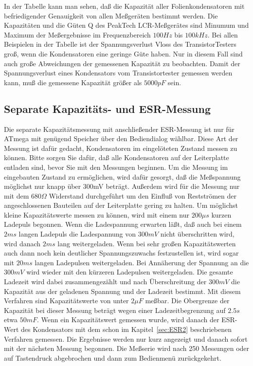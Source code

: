 In der Tabelle kann man sehen, daß die Kapazität aller Folienkondensatoren mit befriedigender Genauigkeit von allen
Meßgeräten bestimmt werden. Die Kapazitäten und die Güten Q des PeakTech LCR-Meßgerätes sind Minumum
und Maximum der Meßergebnisse im Frequenzbereich \(100 Hz\) bis \(100 kHz\).
Bei allen Beispielen in der Tabelle ist der Spannungsverlust Vloss des TransistorTesters groß,
wenn die Kondensatoren eine geringe Güte haben. Nur in diesem Fall sind auch große Abweichungen
der gemessenen Kapazität zu beobachten. Damit der Spannungsverlust eines Kondensators vom
Transistortester gemessen werden kann, muß die gemessene Kapazität größer als \(5000 pF\) sein.

\subsection{Separate Kapazitäts- und ESR-Messung}
Die separate Kapazitätsmessung mit anschließender ESR-Messung ist nur für ATmega mit genügend Speicher
über den Bediendialog wählbar. Diese Art der Messung ist dafür gedacht, Kondensatoren im eingelöteten
Zustand messen zu können. 
Bitte sorgen Sie dafür, daß alle Kondensatoren auf der Leiterplatte entladen sind, bevor Sie mit den
Messungen beginnen.
Um die Messung im eingebauten Zustand zu ermöglichen, wird dafür gesorgt,
daß die Meßspannung möglichst nur knapp über 300mV beträgt.
Außerdem wird für die Messung nur mit dem \(680 \Omega\) Widerstand durchgeführt um den Einfluß von
Restströmen der angeschlossenen Bauteilen auf der Leiterplatte gering zu halten.
Um möglichst kleine Kapazitätswerte messen zu können, wird mit einem nur \(200 \mu s\) kurzen Ladepuls
begonnen. Wenn die Ladespannung erwarten läßt, daß auch bei einem \(2 ms\) langen Ladepuls die Ladespannung
von \(300 mV\) nicht überschritten wird, wird danach \(2 ms\) lang weitergeladen. Wenn bei sehr großen
Kapazitätswerten auch dann noch kein deutlicher Spannungszuwachs festzustellen ist, wird sogar mit
\(20 ms\) langen Ladepulsen weitergeladen. Bei Annäherung der Spannung an die \(300 mV\) wird wieder
mit den kürzeren Ladepulsen weitergeladen. Die gesamte Ladezeit wird dabei zusammengezählt und nach
Überschreitung der \(300 mV\) die Kapazität aus der geladenen Spannung und der Ladezeit bestimmt.
Mit diesem Verfahren sind Kapazitätswerte von unter \(2 \mu F\) meßbar. Die Obergrenze der Kapazität
bei dieser Messung beträgt wegen einer Ladezeitbegrenzung auf \(2.5 s\) etwa \(50 mF\).
Wenn ein Kapazitätswert gemessen wurde, wird danach der ESR-Wert des Kondensators mit dem schon
im Kapitel~\ref{sec:ESR2} beschriebenen Verfahren gemessen.
Die Ergebnisse werden nur kurz angezeigt und danach sofort mit der nächsten Messung begonnen.
Die Meßserie wird nach 250 Messungen oder auf Tastendruck abgebrochen und dann zum Bedienmenü zurückgekehrt.

